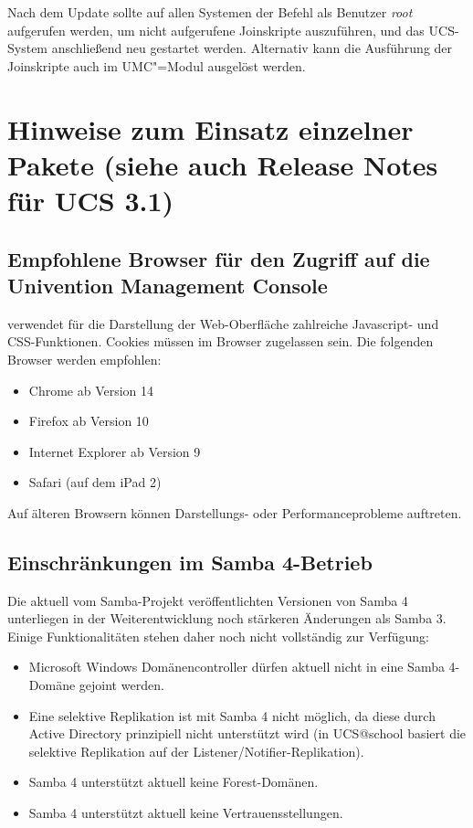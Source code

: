 Nach dem Update sollte auf allen Systemen der
Befehl  als
Benutzer \emph{root} aufgerufen werden, um nicht aufgerufene Joinskripte auszuführen, und
das UCS-System anschließend neu gestartet werden. Alternativ kann die Ausführung 
der Joinskripte auch im UMC"=Modul  ausgelöst werden.



\chapter{Hinweise zum Einsatz einzelner Pakete (siehe auch Release Notes für UCS 3.1)}

\section{Empfohlene Browser für den Zugriff auf die Univention Management Console}

\ucsUMC{} verwendet für die Darstellung der Web-Oberfläche zahlreiche
Javascript- und CSS-Funktionen. Cookies müssen im Browser zugelassen
sein. Die folgenden Browser werden empfohlen:

\begin{itemize}
\item Chrome ab Version 14
\item Firefox ab Version 10
\item Internet Explorer ab Version 9
\item Safari (auf dem iPad 2)
\end{itemize}

Auf älteren Browsern können Darstellungs- oder Performanceprobleme
auftreten.

\section{Einschränkungen im Samba 4-Betrieb}

Die aktuell vom Samba-Projekt veröffentlichten Versionen von Samba 4
unterliegen in der Weiterentwicklung noch stärkeren Änderungen als Samba
3. Einige Funktionalitäten stehen daher noch nicht vollständig zur Verfügung:

\begin{itemize}
\item Microsoft Windows Domänencontroller dürfen aktuell nicht in eine Samba 4-Domäne
gejoint werden.
\item Eine selektive Replikation ist mit Samba 4 nicht möglich, da diese durch
Active Directory prinzipiell nicht unterstützt wird (in UCS@school
basiert die selektive Replikation auf der Listener/Notifier-Replikation).
\item Samba 4 unterstützt aktuell keine Forest-Domänen. 
\item Samba 4 unterstützt aktuell keine Vertrauensstellungen.
\end{itemize}

